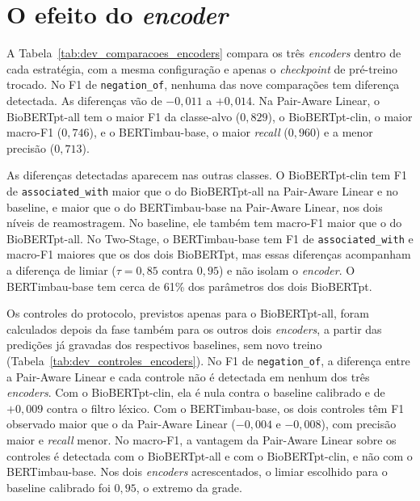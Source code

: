 \section{O efeito do \emph{encoder}}
\label{sec:resultados_encoders}

A Tabela~\ref{tab:dev_comparacoes_encoders} compara os três \emph{encoders} dentro de
cada estratégia, com a mesma configuração e apenas o \emph{checkpoint} de pré-treino
trocado. No F1 de \texttt{negation\_of}, nenhuma das nove comparações tem diferença
detectada. As diferenças vão de $-0{,}011$ a $+0{,}014$. Na Pair-Aware Linear, o
BioBERTpt-all tem o maior F1 da classe-alvo ($0{,}829$), o BioBERTpt-clin, o maior
macro-F1 ($0{,}746$), e o BERTimbau-base, o maior \emph{recall} ($0{,}960$) e a menor
precisão ($0{,}713$).



As diferenças detectadas aparecem nas outras classes. O BioBERTpt-clin tem F1 de
\texttt{associated\_with} maior que o do BioBERTpt-all na Pair-Aware Linear e no
baseline, e maior que o do BERTimbau-base na Pair-Aware Linear, nos dois níveis de
reamostragem. No baseline, ele também tem macro-F1 maior que o do BioBERTpt-all. No
Two-Stage, o BERTimbau-base tem F1 de \texttt{associated\_with} e macro-F1 maiores
que os dos dois BioBERTpt, mas essas diferenças acompanham a diferença de limiar
($\tau=0{,}85$ contra $0{,}95$) e não isolam o \emph{encoder}. O BERTimbau-base tem
cerca de 61\% dos parâmetros dos dois BioBERTpt.

Os controles do protocolo, previstos apenas para o BioBERTpt-all, foram calculados
depois da fase também para os outros dois \emph{encoders}, a partir das predições já
gravadas dos respectivos baselines, sem novo treino
(Tabela~\ref{tab:dev_controles_encoders}). No F1 de \texttt{negation\_of}, a
diferença entre a Pair-Aware Linear e cada controle não é detectada em nenhum dos
três \emph{encoders}. Com o BioBERTpt-clin, ela é nula contra o baseline calibrado
e de $+0{,}009$ contra o filtro léxico. Com o BERTimbau-base, os dois controles
têm F1 observado maior que o da Pair-Aware Linear ($-0{,}004$ e $-0{,}008$), com
precisão maior e \emph{recall} menor. No macro-F1, a vantagem da Pair-Aware Linear
sobre os controles é detectada com o BioBERTpt-all e com o BioBERTpt-clin, e não
com o BERTimbau-base. Nos dois \emph{encoders} acrescentados, o limiar escolhido
para o baseline calibrado foi $0{,}95$, o extremo da grade.



